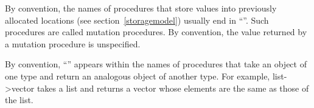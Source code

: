 By convention, the names of procedures that store values into previously
allocated locations (see section~\ref{storagemodel}) usually end in
``\ide{!}''.
Such procedures are called mutation procedures.
By convention, the value returned by a mutation procedure is unspecified.

By convention, ``\ide{->}'' appears within the names of procedures that
take an object of one type and return an analogous object of another type.
For example, {\cf list->vector} takes a list and returns a vector whose
elements are the same as those of the list.


	

